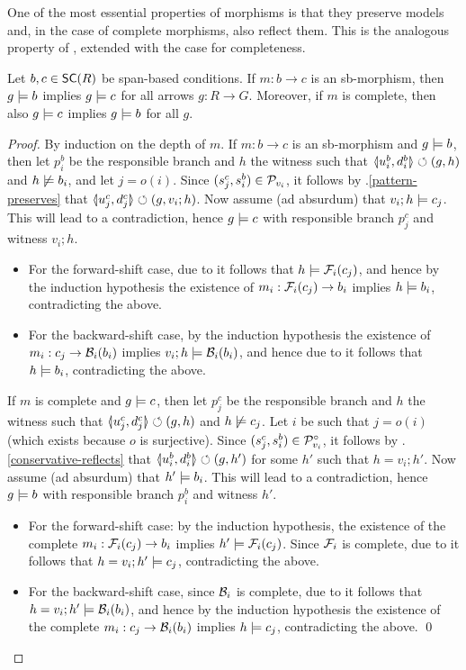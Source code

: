 One of the most essential properties of morphisms is that they preserve models and, in the case of complete morphisms, also reflect them. This is the analogous property of , extended with the case for completeness.
%
\begin{proposition}
Let $b,c \in \SC{R}$ be span-based conditions. If $m:b\to c$ is an sb-morphism, then $g\models b$ implies $g \models c$ for all arrows $g:R\to G$. Moreover, if $m$ is complete, then also $g\models c$ implies $g\models b$ for all $g$.
\end{proposition}
%
\begin{proof}
By induction on the depth of $m$. If $m:b\to c$ is an sb-morphism and $g\models b$, then let $p^b_i$ be the responsible branch and $h$ the witness such that $\spanof{u^b_i}{d^b_i}\commutes (g,h)$ and $h\not\models b_i$, and let $j=o(i)$. Since $(s^c_j,s^b_i)\in \mathcal{P}_{v_i}$, it follows by .\ref{pattern-preserves} that $\spanof{u^c_j}{d^c_j}\commutes (g,v_i;h)$. Now assume (ad absurdum) that $v_i;h\models c_j$. This will lead to a contradiction, hence $g\models c$ with responsible branch $p^c_j$ and witness $v_i;h$.
\begin{itemize}[topsep=\smallskipamount]
\item For the forward-shift case, due to  it follows that $h\models \mathcal{F}_i(c_j)$, and hence by the induction hypothesis the existence of $m_i:\mathcal{F}_i(c_j)\to b_i$ implies $h\models b_i$, contradicting the above.

\item For the backward-shift case, by the induction hypothesis the existence of $m_i:c_j\to \mathcal{B}_i(b_i)$ implies $v_i;h\models \mathcal{B}_i(b_i)$, and hence due to  it follows that $h\models b_i$, contradicting the above.
\end{itemize}
If $m$ is complete and $g\models c$, then let $p^c_j$ be the responsible branch and $h$ the witness such that $\spanof{u^c_j}{d^c_j}\commutes (g,h)$ and $h\not\models c_j$. Let $i$ be such that $j=o(i)$ (which exists because $o$ is surjective). Since $(s^c_j,s^b_i)\in \mathcal{P}^\circ_{v_i}$, it follows by .\ref{conservative-reflects} that $\spanof{u^b_i}{d^b_i}\commutes (g,h')$ for some $h'$ such that $h=v_i;h'$. Now assume (ad absurdum) that $h'\models b_i$. This will lead to a contradiction, hence $g\models b$ with responsible branch $p^b_i$ and witness $h'$.
\begin{itemize}[topsep=\smallskipamount]
\item For the forward-shift case: by the induction hypothesis, the existence of the complete $m_i:\mathcal{F}_i(c_j)\to b_i$ implies $h'\models \mathcal{F}_i(c_j)$. Since $\mathcal{F}_i$ is complete, due to  it follows that $h=v_i;h'\models c_j$, contradicting the above.
\item For the backward-shift case, since $\mathcal{B}_i$ is complete, due to  it follows that $h=v_i;h'\models \mathcal{B}_i(b_i)$, and hence by the induction hypothesis the existence of the complete $m_i:c_j\to \mathcal{B}_i(b_i)$ implies $h\models c_j$, contradicting the above.
\qed
\end{itemize}
\end{proof}
